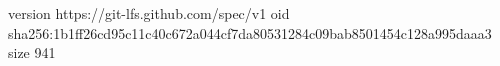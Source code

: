 version https://git-lfs.github.com/spec/v1
oid sha256:1b1ff26cd95c11c40c672a044cf7da80531284c09bab8501454c128a995daaa3
size 941
